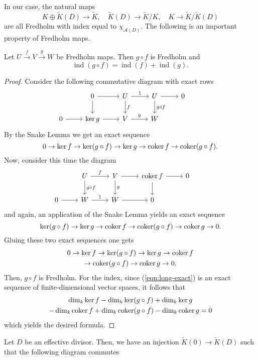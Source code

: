 In our case, the natural maps
\[
	K\oplus \widetilde{K}(D) \to \widetilde{K}, \quad \widetilde{K}(D) \to \widetilde{K}/K, \quad K\to \widetilde{K}/\widetilde{K}(D)
\]
are all Fredholm with index equal to $\chi_{\mathcal{A}(D)}$. The following is an important property of Fredholm maps.
\begin{lemma}\label{lemm:additivity-of-index-composition}
	Let $U \xrightarrow{f} V \xrightarrow{g} W$ be Fredholm maps. Then $g \circ f$ is Fredholm and
	\[
		\operatorname{ind}(g \circ f) = \operatorname{ind}(f) + \operatorname{ind}(g).
	\]
\end{lemma}
\begin{proof}
Consider the following commutative diagram with exact rows
\[
	\begin{tikzcd}
	& 0 \ar[r] \ar[d] & U \ar[r, "1"] \ar[d, "f"] & U \ar[r] \ar[d, "g\circ f"] & 0 \\
		0 \ar[r] & \ker g \ar[r] & V \ar[r, "g"] & W & & 
	\end{tikzcd}
\]
By the Snake Lemma we get an exact sequence
\[
	0 \to \ker f \to \ker (g \circ f) \to \ker g \to \operatorname{coker} f \to \operatorname{coker} (g\circ f). 
\]
Now, consider this time the diagram
\[
	\begin{tikzcd}
	& U \ar[r, "f"] \ar[d, "g\circ f"] & V \ar[r] \ar[d, "g"] & \coker f \ar[r] \ar[d] & 0 \\
		0 \ar[r] & W \ar[r, "1"] & W \ar[r] & 0 & & 
	\end{tikzcd}
\]
and again, an application of the Snake Lemma yields an exact sequence
\[
	\ker (g \circ f) \to \ker g \to \operatorname{coker} f \to \operatorname{coker} (g \circ f) \to \operatorname{coker} g \to 0.
\]
Gluing these two exact sequences one gets
\begin{multline}\label{eqn:long-exact}
	0 \to \ker f \to \ker (g \circ f) \to \ker g \to \operatorname{coker} f  \\ \to \operatorname{coker} (g \circ f) \to \operatorname{coker} g \to 0.
\end{multline}
Then, $g \circ f$ is Fredholm. For the index, since (\ref{eqn:long-exact}) is an exact sequence of finite-dimensional vector spaces, it follows that
\begin{multline*}
	\dim_{k}\ker f - \dim_{k}\ker (g \circ f) + \dim_{k}\ker g  \\ - \dim_{k}\operatorname{coker} f + \dim_{k}\operatorname{coker} (g \circ f) - \dim_{k} \operatorname{coker} g = 0
\end{multline*}
which yields the desired formula.
\end{proof}	
Let $D$ be an effective divisor. Then, we have an injection $\widetilde{K}(0) \to \widetilde{K}(D)$ such that the following diagram commutes
